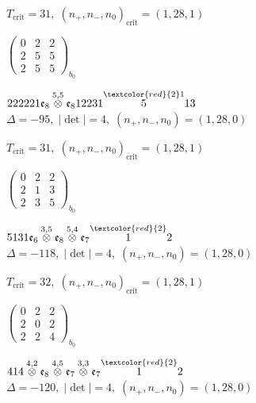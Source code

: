 \documentclass[10pt]{article}
\begin{document}
\hspace{1em}$T_{\text{crit}}=31,\; (n_+,n_-,n_0)_{\text{crit}}=(1,28,1)$

\hspace{2em}$\left(\begin{smallmatrix}0 & 2 & 2 \\ 2 & 5 & 5 \\ 2 & 5 & 5\end{smallmatrix}\right)_{\!b_0}$

\smallskip

$222221\mathfrak{e}_8\overset{5,5}{\otimes}\mathfrak{e}_812231\overset{\textcolor{red}{2}1}{5}13$ \quad $\Delta=-95,\; |\det|=4,\; (n_+,n_-,n_0)=(1,28,0)$

\hspace{1em}$T_{\text{crit}}=31,\; (n_+,n_-,n_0)_{\text{crit}}=(1,28,1)$

\hspace{2em}$\left(\begin{smallmatrix}0 & 2 & 2 \\ 2 & 1 & 3 \\ 2 & 3 & 5\end{smallmatrix}\right)_{\!b_0}$

\smallskip

$5131\mathfrak{e}_6\overset{3,5}{\otimes}\mathfrak{e}_8\overset{5,4}{\otimes}\mathfrak{e}_7\overset{\textcolor{red}{2}}{1}2$ \quad $\Delta=-118,\; |\det|=4,\; (n_+,n_-,n_0)=(1,28,0)$

\hspace{1em}$T_{\text{crit}}=32,\; (n_+,n_-,n_0)_{\text{crit}}=(1,28,1)$

\hspace{2em}$\left(\begin{smallmatrix}0 & 2 & 2 \\ 2 & 0 & 2 \\ 2 & 2 & 4\end{smallmatrix}\right)_{\!b_0}$

\smallskip

$414\overset{4,2}{\otimes}\mathfrak{e}_8\overset{4,5}{\otimes}\mathfrak{e}_7\overset{3,3}{\otimes}\mathfrak{e}_7\overset{\textcolor{red}{2}}{1}2$ \quad $\Delta=-120,\; |\det|=4,\; (n_+,n_-,n_0)=(1,28,0)$
\end{document}
